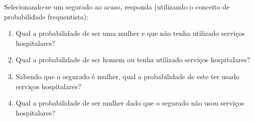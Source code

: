 \documentclass[
]{article}
\begin{document}
Selecionando-se um segurado ao acaso, responda (utilizando o conceito de
probabilidade frequentista):

\begin{enumerate}
\def\labelenumi{\alph{enumi}.}
\item
  Qual a probabilidade de ser uma mulher e que não tenha utilizado
  serviços hospitalares?
\item
  Qual a probabilidade de ser homem ou tenha utilizado serviços
  hospitalares?
\item
  Sabendo que o segurado é mulher, qual a probabilidade de este ter
  usado serviços hospitalares?
\item
  Qual a probabilidade de ser mulher dado que o segurado não usou
  serviços hospitalares?
\end{enumerate}
\end{document}
